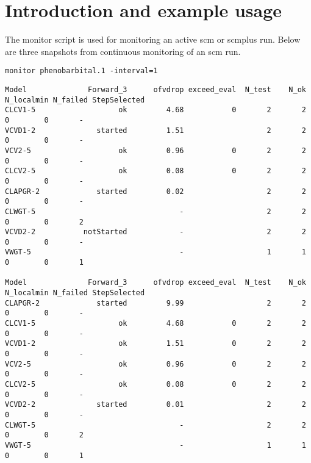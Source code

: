 \documentclass[hideglossary,notoc,hidelof,hidelot,hideTheSignaturePage,hideLinkCurrent,hideloa,pdfLatex,noClient,notitle,hideConfidential]{PMXstyle-20170118kajsa4}
\begin{document}
\section{Introduction and example usage}
The monitor script is used for monitoring an active scm or scmplus run.
Below are three snapshots from continuous monitoring of an scm run.
\begin{verbatim}
monitor phenobarbital.1 -interval=1
\end{verbatim}
{\tiny
\begin{verbatim}
Model              Forward_3      ofvdrop exceed_eval  N_test    N_ok N_localmin N_failed StepSelected
CLCV1-5                   ok         4.68           0       2       2          0        0       -
VCVD1-2              started         1.51                   2       2          0        0       -
VCV2-5                    ok         0.96           0       2       2          0        0       -
CLCV2-5                   ok         0.08           0       2       2          0        0       -
CLAPGR-2             started         0.02                   2       2          0        0       -
CLWGT-5                                 -                   2       2          0        0       2
VCVD2-2           notStarted            -                   2       2          0        0       -
VWGT-5                                  -                   1       1          0        0       1

Model              Forward_3      ofvdrop exceed_eval  N_test    N_ok N_localmin N_failed StepSelected
CLAPGR-2             started         9.99                   2       2          0        0       -
CLCV1-5                   ok         4.68           0       2       2          0        0       -
VCVD1-2                   ok         1.51           0       2       2          0        0       -
VCV2-5                    ok         0.96           0       2       2          0        0       -
CLCV2-5                   ok         0.08           0       2       2          0        0       -
VCVD2-2              started         0.01                   2       2          0        0       -
CLWGT-5                                 -                   2       2          0        0       2
VWGT-5                                  -                   1       1          0        0       1


\end{verbatim}}
\end{document}
